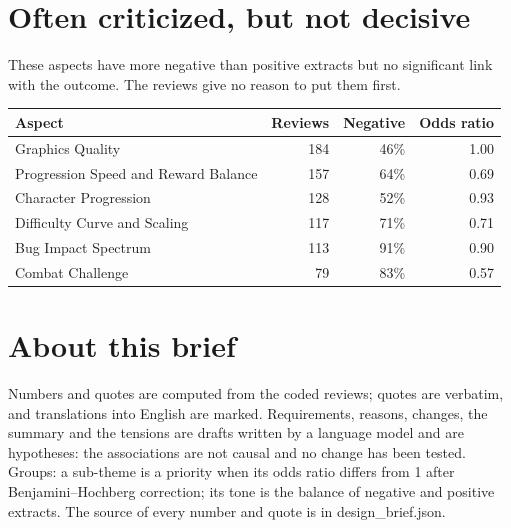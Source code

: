 \documentclass[10pt]{article}
\begin{document}
\section*{Often criticized, but not decisive}
{\small These aspects have more negative than positive extracts but no significant link with the outcome. The reviews give no reason to put them first.\par\smallskip
\begin{tabular}{l r r r}
  \toprule
  \rowcolor{head}\textbf{Aspect} & \textbf{Reviews} & \textbf{Negative} & \textbf{Odds ratio} \\
  \midrule
  Graphics Quality & 184 & 46\% & 1.00 \\
  Progression Speed and Reward Balance & 157 & 64\% & 0.69 \\
  Character Progression & 128 & 52\% & 0.93 \\
  Difficulty Curve and Scaling & 117 & 71\% & 0.71 \\
  Bug Impact Spectrum & 113 & 91\% & 0.90 \\
  Combat Challenge & 79 & 83\% & 0.57 \\
  \bottomrule
\end{tabular}}

\section*{About this brief}
{\small Numbers and quotes are computed from the coded reviews; quotes are verbatim, and translations into English are marked. Requirements, reasons, changes, the summary and the tensions are drafts written by a language model and are hypotheses: the associations are not causal and no change has been tested. Groups: a sub-theme is a priority when its odds ratio differs from 1 after Benjamini--Hochberg correction; its tone is the balance of negative and positive extracts. The source of every number and quote is in design\_brief.json.}
\end{document}
